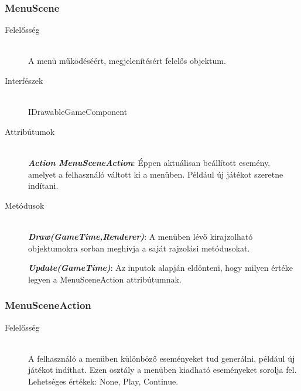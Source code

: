 \subsubsection{MenuScene}
	\begin{description}
		\item[Felelősség] \hfill \\
		A menü működéséért, megjelenítésért felelős objektum.

		\item[Interfészek]\hfill \\
		IDrawableGameComponent

		\item[Attribútumok]\hfill \\
		\textbf{\emph{Action MenuSceneAction}}: Éppen aktuálisan beállított esemény, amelyet a felhasználó váltott ki a menüben. Például új játékot szeretne indítani.

		\item[Metódusok]\hfill \\
		\textbf{\emph{Draw(GameTime,Renderer)}}: A menüben lévő kirajzolható objektumokra sorban meghívja a saját rajzolási metódusokat.

		\textbf{\emph{Update(GameTime)}}: Az inputok alapján eldönteni, hogy milyen értéke legyen a MenuSceneAction attribútumnak.
	\end{description}


\subsubsection{MenuSceneAction}
	\begin{description}
		\item[Felelősség] \hfill \\
		A felhasználó a menüben különböző eseményeket tud generálni, például új játékot indíthat. Ezen osztály a menüben kiadható eseményeket sorolja fel. Lehetséges értékek: None, Play, Continue.
	\end{description}
	
